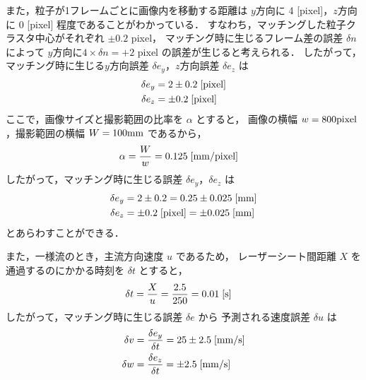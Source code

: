 \documentclass[twocolumn,a4j]{jsarticle}
\begin{document}
また，粒子が1フレームごとに画像内を移動する距離は $y$方向に
4 [pixel]，$z$方向に 0 [pixel] 程度であることがわかっている．
すなわち，マッチングした粒子クラスタ中心がそれぞれ $\pm 0.2$ pixel，
マッチング時に生じるフレーム差の誤差 $\delta n$ によって
$y$方向に$4 \times \delta n = +2$ pixel の誤差が生じると考えられる．
したがって，マッチング時に生じる$y$方向誤差 $\delta e_y$，$z$方向誤差 $\delta e_z$ は
\begin{align*}
  \delta e_y & = 2 \pm 0.2 \;\rm{[pixel]} \\
  \delta e_z & = \pm 0.2 \;\rm{[pixel]}
\end{align*}
ここで，画像サイズと撮影範囲の比率を $\alpha$ とすると，
画像の横幅 $w = 800 \rm{pixel}$，撮影範囲の横幅 $W = 100 \rm{mm}$ であるから，
\begin{align*}
  \alpha & = \frac{W}{w} = 0.125 \;\rm{[mm/pixel]}
\end{align*}
したがって，マッチング時に生じる誤差 $\delta e_y$，$\delta e_z$ は
\begin{align*}
  \delta e_y & = 2 \pm 0.2  = 0.25 \pm 0.025 \;\rm{[mm]}        \\
  \delta e_z & = \pm 0.2 \;\rm{[pixel]} = \pm 0.025 \;\rm{[mm]}
\end{align*}
とあらわすことができる．　

また，一様流のとき，主流方向速度 $u$ であるため，
レーザーシート間距離 $X$ を通過するのにかかる時刻を $\delta t$ とすると，
\begin{align*}
  \delta t & = \frac{X}{u} = \frac{2.5}{250} = 0.01 \;\rm{[s]}
\end{align*}
したがって，マッチング時に生じる誤差 $\delta e$ から
予測される速度誤差 $\delta u$ は
\begin{align*}
  \delta v & = \frac{\delta e_y}{\delta t} = 25 \pm 2.5 \;\rm{[mm/s]} \\
  \delta w & = \frac{\delta e_z}{\delta t} = \pm 2.5 \;\rm{[mm/s]}
\end{align*}

\newpage
\end{document}
